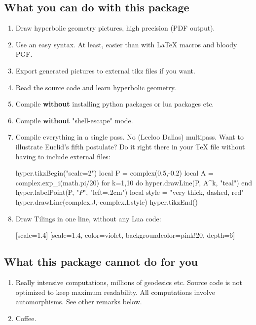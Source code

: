 \documentclass{article}
\begin{document}
\subsection{What you can do with this package}
\begin{enumerate}
\item Draw hyperbolic geometry pictures, high precision (PDF output).
\item Use an easy syntax. At least, easier than with \LaTeX{} macros and bloody PGF.
\item Export generated pictures to external tikz files if you want.
\item Read the source code and learn hyperbolic geometry.
\item Compile \textbf{without} installing python packages or lua packages etc.
\item Compile \textbf{without}  "shell-escape" mode.
\item Compile everything in a single pass. No (Leeloo Dallas) multipass.
Want to illustrate Euclid's fifth postulate?
Do it right there in your TeX file without having to include external files:

\begin{codeandresult}
\begin{luacode*}
hyper.tikzBegin("scale=2")
local P = complex(0.5,-0.2)
local A = complex.exp_i(math.pi/20)
for k=1,10 do
	hyper.drawLine(P, A^k, "teal")
end
hyper.labelPoint(P, "$P$", "left=.2cm")
local style = "very thick, dashed, red"
hyper.drawLine(complex.J,-complex.I,style)
hyper.tikzEnd()
\end{luacode*}
\end{codeandresult}
\item Draw Tilings in one line, without any Lua code:
\begin{codeandresult}
[scale=1.4]
[scale=1.4, color=violet, backgroundcolor=pink!20, depth=6]
\end{codeandresult}
\end{enumerate}


\subsection{What this package cannot do for you}

\begin{enumerate}
\item Really intensive computations, millions of geodesics etc.  Source code is not optimized to keep maximum readability. All computations involve automorphisms. See other remarks below.
\item Coffee.
\end{enumerate}
\end{document}
